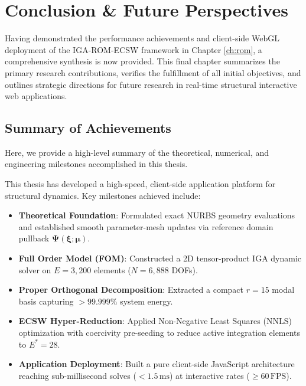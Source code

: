 \chapter{Conclusion \& Future Perspectives}
\label{ch:conclusion}


Having demonstrated the performance achievements and client-side WebGL deployment of the IGA-ROM-ECSW framework in Chapter \ref{ch:rom}, a comprehensive synthesis is now provided. This final chapter summarizes the primary research contributions, verifies the fulfillment of all initial objectives, and outlines strategic directions for future research in real-time structural interactive web applications.

\section{Summary of Achievements}

Here, we provide a high-level summary of the theoretical, numerical, and engineering milestones accomplished in this thesis.

This thesis has developed a high-speed, client-side application platform for structural dynamics. Key milestones achieved include:

\begin{itemize}[leftmargin=*]
    \item \textbf{Theoretical Foundation}: Formulated exact NURBS geometry evaluations and established smooth parameter-mesh updates via reference domain pullback $\boldsymbol{\Psi}(\boldsymbol{\xi}; \boldsymbol{\mu})$.
    \item \textbf{Full Order Model (FOM)}: Constructed a 2D tensor-product IGA dynamic solver on $E = 3,200$ elements ($N = 6,888$ DOFs).
    \item \textbf{Proper Orthogonal Decomposition}: Extracted a compact $r = 15$ modal basis capturing $>99.999\%$ system energy.
    \item \textbf{ECSW Hyper-Reduction}: Applied Non-Negative Least Squares (NNLS) optimization with coercivity pre-seeding to reduce active integration elements to $E^* = 28$.
    \item \textbf{Application Deployment}: Built a pure client-side JavaScript architecture reaching sub-millisecond solves ($<1.5\,\text{ms}$) at interactive rates ($\ge 60\,\text{FPS}$).
\end{itemize}

